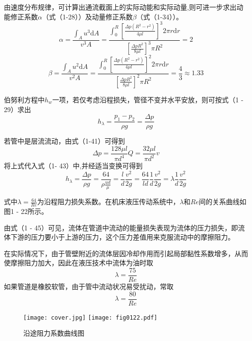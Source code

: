 由速度分布规律，可计算出通流截面上的实际动能和实际动量,则可进一步求出动能修正系数$\alpha$（式（1-28））及动量修正系数$\beta$（式（1-34））。
\begin{equation*}
\alpha =\frac{\int_{A}u^{3}\mathrm{d}A}{v^{3}A}=\frac{\int_{0} ^{R}[\frac{\Delta p(R^{2}-r^{2})}{4\mu l}]^{3}2\pi r\mathrm{d}r}{[\frac{\Delta pR^{2}}{8\mu l}]^{3}\pi R^{2}}=2
\end{equation*}
\begin{equation*}
\beta =\frac{\int_{A}u^{2}\mathrm{d}A}{v^{2}A}=\frac{\int_{0} ^{R}[\frac{\Delta p(R^{2}-r^{2})}{4\mu l}]^{2}2\pi r\mathrm{d}r}{[\frac{\Delta pR^{2}}{8\mu l}]^{2}\pi R^{2}}=\frac{4}{3}\approx 1.33
\end{equation*}

伯努利方程中$h_{w}$一项，若仅考虑沿程损失，管径不变并水平安放，则可按式（1 - 29）求出
\begin{equation}
h_{\lambda}=\frac{p_{1}-p_{2}}{\rho g}=\frac{\Delta p}{\rho g}
\end{equation}

若管中是层流流动，由式（1-41）可得到
\begin{equation}
\Delta p=\frac{128\mu l}{\pi d^{4}}Q=\frac{32\mu l}{\pi d^{2}}v
\end{equation}
将上式代入式（1- 43）中,并经适当变换可得到
\begin{equation}
h_{\lambda}=\frac{\Delta p}{\rho g}=\frac{64}{\rho \frac{ud}{\mu}}=\frac{l}{d} \frac{v^{2}}{2g}=\frac{64}{ld}\frac{1}{d}\frac{v^{2}}{2g}=\lambda \frac{1}{d}\frac{v^{2}}{2g}
\end{equation}

\noindent 式中$\lambda = \frac{64}{Re}$为沿程阻力损失系数。在机床液压传动系统中，$\lambda$和$Re$间的关系曲线如图1 - 22所示。 

由式（1 - 45）可见，流体在管道中流动的能量损失表现为流体的压力损失，即流体下游的压力要小于上游的压力，这个压力差值用来克服流动中的摩擦阻力。

在实际情况下，由于管壁附近的流体层因冷却作用而引起局部黏性系数增多，从而使摩擦阻力加大，因此在液压技术中流体为油时取
\begin{equation*}
\lambda= \frac{75}{Re}
\end{equation*}
如果管道是橡胶软管，由于管中流动状况易受扰动，常取
\begin{equation*}
\lambda= \frac{80}{Re}
\end{equation*}
\begin{figure}
    \centering
    \ifOpenSource
    \texttt{[image: cover.jpg]}
    \else
    \texttt{[image: fig0122.pdf]}
    \fi
    \caption{沿途阻力系数曲线图}%
    \label{fig0122}
\end{figure}